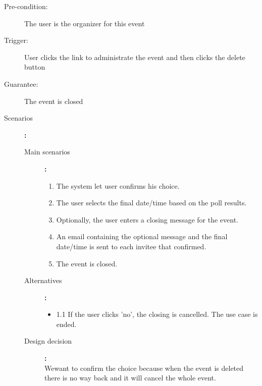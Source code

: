 \begin{description}
	\item[Pre-condition:] The user is the organizer for this event
	\item[Trigger:] User clicks the link to administrate the event and then clicks the delete button
	\item[Guarantee:] The event is closed
	\item[Scenarios]\textbf{:}\\
				\begin{description}
					\item[Main scenarios]\textbf{:}\\
								\begin{enumerate}
									\item The system let user confirms his choice.
									\item The user selects the final date/time based on the poll results.
									\item Optionally, the user enters a closing message for the event.
									\item An email containing the optional message and the final date/time is sent to each invitee that confirmed.
									\item The event is closed.
								\end{enumerate}
					\item[Alternatives]\textbf{:}\\
								\begin{itemize}
									\item 1.1 If the user clicks 'no', the closing is cancelled. The use case is ended.
								\end{itemize}
					\item[Design decision]\textbf{:}\\Wewant to confirm the choice because when the event is deleted there is no way back and it will cancel the whole event.
				\end{description}
\end{description}

